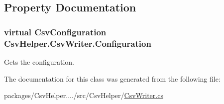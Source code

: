 \subsection{Property Documentation}
\hypertarget{a00059_a5124d88929643a9a9fc95f5a0630fce8}{
\subsubsection[{Configuration}]{\setlength{\rightskip}{0pt plus 5cm}virtual {\bf Csv\-Configuration} Csv\-Helper.\-Csv\-Writer.\-Configuration\hspace{0.3cm}{\ttfamily [get]}}}\label{a00059_a5124d88929643a9a9fc95f5a0630fce8}


Gets the configuration. 



The documentation for this class was generated from the following file\-:\begin{DoxyCompactItemize}
\item 
packages/\-Csv\-Helper..../src/\-Csv\-Helper/\hyperlink{a00202}{Csv\-Writer.\-cs}\end{DoxyCompactItemize}

